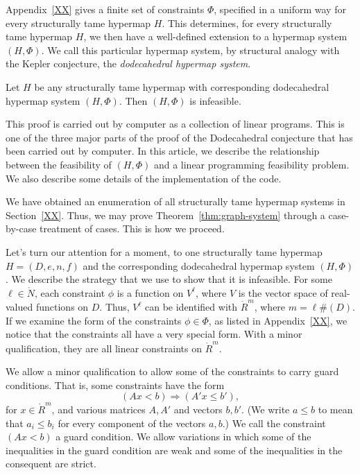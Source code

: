 Appendix~\ref{XX} gives a finite set of constraints $\Phi$, 
specified
in a uniform way for every structurally tame hypermap $H$.  This determines,
for every structurally tame hypermap $H$, we then have a well-defined extension
to a hypermap system $(H,\Phi)$.  We call this particular hypermap
system, by structural analogy with the Kepler conjecture,
the {\it dodecahedral hypermap system}.  


\begin{theorem}\label{thm:graph-system}  Let 
$H$ be any structurally tame hypermap with corresponding
dodecahedral hypermap system $(H,\Phi)$.  Then $(H,\Phi)$ is infeasible.
\end{theorem}

This proof is carried out by computer as a collection of linear
programs.  This is one of the three major parts of the proof
of the Dodecahedral conjecture that has been carried out by computer.
In this article, we describe the relationship between the
feasibility of $(H,\Phi)$ and a linear programming feasibility
problem.  We also describe some details of the implementation of 
the code.

We have obtained an enumeration of all structurally tame
hypermap systems in Section~\ref{XX}.  Thus,  we may prove
Theorem~\ref{thm:graph-system} through a case-by-case treatment
of cases.  This is how we proceed.

Let's turn our attention for a moment, to one structurally tame hypermap $H=(D,e,n,f)$ and the corresponding dodecahedral hypermap system $(H,\Phi)$.
We describe the strategy that we use to show that it is infeasible.
For some $\ell\in\ring{N}$,
each constraint $\phi$ is a function on $V^\ell$, where $V$ is
the vector space of real-valued functions on $D$.  Thus,
$V^\ell$ can be identified with $\ring{R}^m$, where $m= \ell \#(D)$.
If we examine the form of the constraints $\phi\in \Phi$, as listed
in Appendix~\ref{XX}, we notice that the constraints all have a 
very special form.  With a minor qualification, they are all linear constraints
on $\ring{R}^m$.  

We allow a minor qualification to allow some of the constraints
to carry guard conditions.  That is, some constraints have the form
  \begin{equation}\label{eqn:guard}
  (A x < b)  \Rightarrow (A' x \le b'),
  \end{equation}
for $x\in\ring{R}^m$, and various matrices $A,A'$ and vectors
$b,b'$.  (We write $a \le b$ to mean
that $a_i\le b_i$ for every component of the vectors $a,b$.)
We call the constraint $(A x < b)$ a guard condition.
We allow variations in which some of the inequalities in the
guard condition are weak and some of the inequalities in the
consequent are strict.

